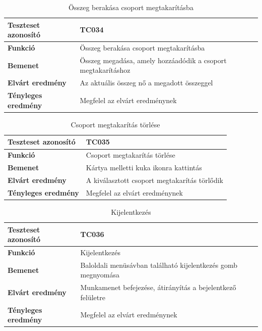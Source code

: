 \begin{table}[h!]
	\centering
	\begin{tabular}{|l|p{10cm}|}
		\hline
		\textbf{Teszteset azonosító} & TC034 \\ \hline
		\textbf{Funkció} & Összeg berakása csoport megtakarításba \\ \hline
		\textbf{Bemenet} & Összeg megadása, amely hozzáadódik a csoport megtakarításhoz \\ \hline
		\textbf{Elvárt eredmény} & Az aktuális összeg nő a megadott összeggel \\ \hline
		\textbf{Tényleges eredmény} & Megfelel az elvárt eredménynek \\ \hline
	\end{tabular}
	\caption{Összeg berakása csoport megtakarításba}
	\label{tab:csoport_megtakaritas_berakas}
\end{table}
\begin{table}[h!]
	\centering
	\begin{tabular}{|l|p{10cm}|}
		\hline
		\textbf{Teszteset azonosító} & TC035 \\ \hline
		\textbf{Funkció} & Csoport megtakarítás törlése \\ \hline
		\textbf{Bemenet} & Kártya melletti kuka ikonra kattintás \\ \hline
		\textbf{Elvárt eredmény} & A kiválasztott csoport megtakarítás törlődik \\ \hline
		\textbf{Tényleges eredmény} & Megfelel az elvárt eredménynek \\ \hline
	\end{tabular}
	\caption{Csoport megtakarítás törlése}
	\label{tab:csoport_megtakaritas_torles}
\end{table}
\begin{table}[h!]
	\centering
	\begin{tabular}{|l|p{10cm}|}
		\hline
		\textbf{Teszteset azonosító} & TC036 \\ \hline
		\textbf{Funkció} & Kijelentkezés \\ \hline
		\textbf{Bemenet} & Baloldali menüsávban található kijelentkezés gomb megnyomása \\ \hline
		\textbf{Elvárt eredmény} & Munkamenet befejezése, átirányítás a bejelentkező felületre \\ \hline
		\textbf{Tényleges eredmény} & Megfelel az elvárt eredménynek \\ \hline
	\end{tabular}
	\caption{Kijelentkezés}
	\label{tab:kijelentkezes}
\end{table}


